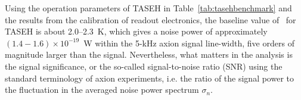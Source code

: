 
Using the operation parameters of TASEH in Table~\ref{tab:tasehbenchmark} and 
the results from the calibration of readout electronics, 
the baseline value of \tsys\ for TASEH 
is about 2.0--2.3~K, which gives a noise power of approximately 
$\left(1.4-1.6\right)\times 10^{-19}$~W within the 5-kHz axion signal 
line-width, five 
orders of magnitude larger than the signal. Nevertheless, what matters in the 
analysis is the signal significance, or the so-called signal-to-noise ratio 
(SNR) using the standard terminology of axion experiments, i.e. the ratio of 
the signal power to the fluctuation in the averaged noise power spectrum 
$\sigma_n$. 

